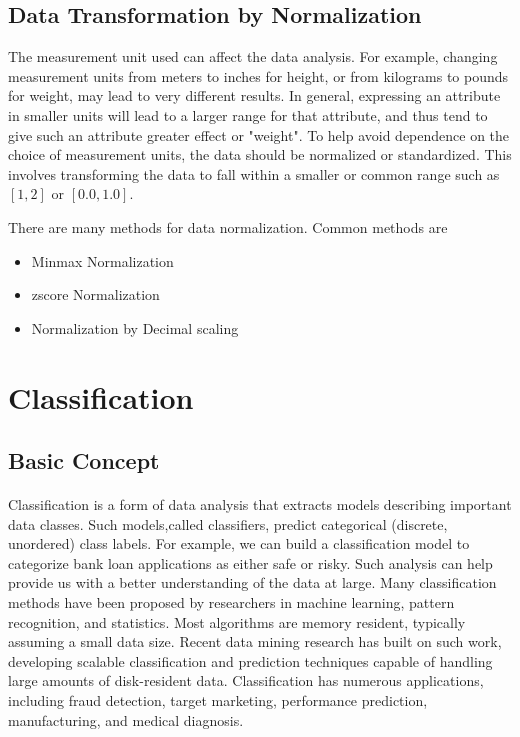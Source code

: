 \subsection{Data Transformation by Normalization}
The measurement unit used can affect the data analysis. For example, changing measurement units from meters
to inches for height, or from kilograms to pounds for weight, may lead to very different results. In general,
expressing an attribute in smaller units will lead to a larger range for that attribute, and thus tend to give such
an attribute greater effect or "weight". To help avoid dependence on the choice of measurement units, the data
should be normalized or standardized. This involves transforming the data to fall within a smaller or common
range such as $[1, 2]$ or $[0.0, 1.0]$.

There are many methods for data normalization. Common methods are 
\begin{itemize}
\item Min\-max Normalization
\item  z\-score Normalization
\item Normalization by Decimal scaling
\end{itemize} 


\section{Classification}
\subsection{Basic Concept}

\paragraph{}Classification is a form of data analysis that extracts models describing important data classes. Such models,called classifiers, predict categorical (discrete, unordered) class labels. For example, we can build a
classification model to categorize bank loan applications as either safe or risky. Such analysis can help provide
us with a better understanding of the data at large. Many classification methods have been proposed by
researchers in machine learning, pattern recognition, and statistics. Most algorithms are memory resident,
typically assuming a small data size. Recent data mining research has built on such work, developing scalable
classification and prediction techniques capable of handling large amounts of disk-resident data. Classification
has numerous applications, including fraud detection, target marketing, performance prediction, manufacturing,
and medical diagnosis.

